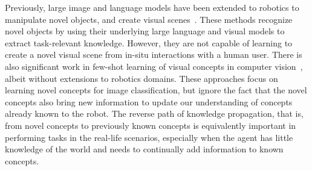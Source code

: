 Previously, large image and language models have been extended to robotics to manipulate novel objects, and create visual scenes~\citep{shridhar2021cliport, brohan2023rt2}. 
These methods recognize novel objects by using their underlying large language and visual models to extract task-relevant knowledge.
However, they are not capable of learning to create a novel visual scene from  in-situ interactions with a human user.
There is also significant work in few-shot learning of  visual concepts in computer vision~\citep{mei2022falcon, snell2017prototypical,vinyals2017matching, sung2018learning, wang2018zeroshot, tian2020rethinking}, albeit without extensions to robotics domains.
These approaches focus on learning novel concepts for image classification, but ignore the fact that the novel concepts also bring new information to update our understanding of concepts already known to the robot.
The reverse path of knowledge propagation, that is, from novel concepts to previously known concepts is equivalently important in performing tasks in the real-life scenarios, especially when the agent has little knowledge of the world and needs to continually add information to known concepts. 


